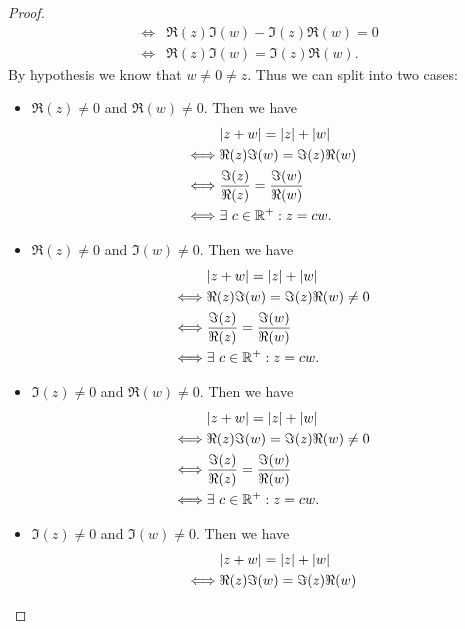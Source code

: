 \begin{proof}
\begin{align*}
    \iff & \Re(z) \Im(w) - \Im(z) \Re(w) = 0                                                                               \\
    \iff & \Re(z) \Im(w) = \Im(z) \Re(w).
  \end{align*}
  By hypothesis we know that \(w \neq 0 \neq z\).
  Thus we can split into two cases:
  \begin{itemize}
    \item \(\Re(z) \neq 0\) and \(\Re(w) \neq 0\).
          Then we have
          \begin{align*}
                 & \abs{z + w} = \abs{z} + \abs{w}                 \\
            \iff & \Re(z) \Im(w) = \Im(z) \Re(w)                   \\
            \iff & \dfrac{\Im(z)}{\Re(z)} = \dfrac{\Im(w)}{\Re(w)} \\
            \iff & \exists\ c \in \R^+ : z = cw.
          \end{align*}
    \item \(\Re(z) \neq 0\) and \(\Im(w) \neq 0\).
          Then we have
          \begin{align*}
                 & \abs{z + w} = \abs{z} + \abs{w}                 \\
            \iff & \Re(z) \Im(w) = \Im(z) \Re(w) \neq 0            \\
            \iff & \dfrac{\Im(z)}{\Re(z)} = \dfrac{\Im(w)}{\Re(w)} \\
            \iff & \exists\ c \in \R^+ : z = cw.
          \end{align*}
    \item \(\Im(z) \neq 0\) and \(\Re(w) \neq 0\).
          Then we have
          \begin{align*}
                 & \abs{z + w} = \abs{z} + \abs{w}                 \\
            \iff & \Re(z) \Im(w) = \Im(z) \Re(w) \neq 0            \\
            \iff & \dfrac{\Im(z)}{\Re(z)} = \dfrac{\Im(w)}{\Re(w)} \\
            \iff & \exists\ c \in \R^+ : z = cw.
          \end{align*}
    \item \(\Im(z) \neq 0\) and \(\Im(w) \neq 0\).
          Then we have
          \begin{align*}
                 & \abs{z + w} = \abs{z} + \abs{w}                 \\
            \iff & \Re(z) \Im(w) = \Im(z) \Re(w)                   \\

\end{align*}
\end{itemize}
\end{proof}
